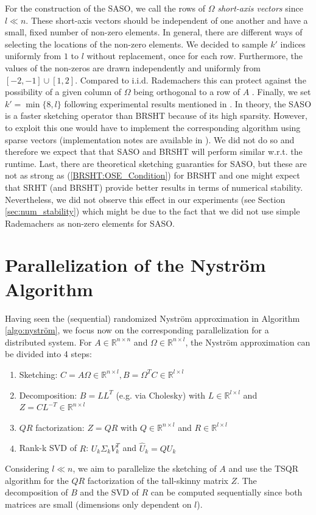\documentclass{article}
\theoremstyle{definition}
\begin{document}
For the construction of the SASO, we call the rows of $\Omega$
\textit{short-axis vectors} since $l \ll n$. These short-axis vectors should be
independent of one another and have a small, fixed number of non-zero elements.
In general, there are different ways of selecting the locations of the non-zero
elements. We decided to sample $k'$ indices uniformly from $1$ to $l$ without
replacement, once for each row. Furthermore, the values of the non-zeros are
drawn independently and uniformly from $[-2,-1] \cup [1, 2]$. Compared to i.i.d.
Rademachers this can protect against the possibility of a given column of
$\Omega$ being orthogonal to a row of $A$ \cite{murray2023}. Finally, we set $k'
= \min\{8, l\}$ following experimental results mentioned in \cite{murray2023}.
In theory, the SASO is a faster sketching operator than BRSHT because of its
high sparsity. However, to exploit this one would have to implement the
corresponding algorithm using sparse vectors (implementation notes are available
in \cite{murray2023}). We did not do so and therefore we expect that that SASO
and BRSHT will perform similar w.r.t. the runtime. Last, there are theoretical
sketching guaranties for SASO, but these are not as strong as
(\ref{BRSHT:OSE_Condition}) for BRSHT and one might expect that SRHT (and BRSHT)
provide better results in terms of numerical stability. Nevertheless, we did not
observe this effect in our experiments (see Section \ref{sec:num_stability})
which might be due to the fact that we did not use simple Rademachers as
non-zero elements for SASO.

\section{Parallelization of the Nyström Algorithm}\label{sec:parallel_nystrom}
Having seen the (sequential) randomized Nyström approximation in Algorithm
\ref{algo:nyström}, we focus now on the corresponding parallelization for a
distributed system. For $A \in \mathbb{R}^{n \times n}$ and $\Omega \in
\mathbb{R}^{n \times l}$, the Nyström approximation can be divided into 4 steps:
\begin{enumerate}
    \item Sketching: $C = A \Omega \in \mathbb{R}^{n \times l}, B = \Omega^T C
            \in \mathbb{R}^{l \times l}$
    \item Decomposition: $B = LL^T$ (e.g. via Cholesky) with $L \in
            \mathbb{R}^{l \times l}$ and $Z = C L^{-T} \in \mathbb{R}^{n \times
            l}$
    \item $QR$ factorization: $Z = QR$ with $Q \in \mathbb{R}^{n \times l}$ and
            $R \in \mathbb{R}^{l \times l}$
    \item Rank-k SVD of $R$: $U_k \Sigma_k V_k^T$ and $\hat{U}_k = Q U_k$
\end{enumerate}
Considering $l \ll n$, we aim to parallelize the sketching of $A$ and use the
TSQR algorithm for the $QR$ factorization of the tall-skinny matrix $Z$. The
decomposition of $B$ and the SVD of $R$ can be computed sequentially since both
matrices are small (dimensions only dependent on $l$).\newline
\end{document}
